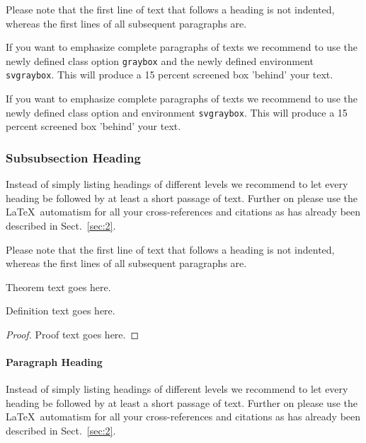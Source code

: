 \documentclass[graybox]{svmult}
\begin{document}
Please note that the first line of text that follows a heading is not indented, whereas the first lines of all subsequent paragraphs are.

\begin{svgraybox}
If you want to emphasize complete paragraphs of texts we recommend to use the newly defined class option \verb|graybox| and the newly defined environment \verb|svgraybox|. This will produce a 15 percent screened box 'behind' your text.

If you want to emphasize complete paragraphs of texts we recommend to use the newly defined class option and environment \verb|svgraybox|. This will produce a 15 percent screened box 'behind' your text.
\end{svgraybox}


\subsubsection{Subsubsection Heading}
Instead of simply listing headings of different levels we recommend to let every heading be followed by at least a short passage of text.  Further on please use the \LaTeX\ automatism for all your cross-references and citations as has already been described in Sect.~\ref{sec:2}.

Please note that the first line of text that follows a heading is not indented, whereas the first lines of all subsequent paragraphs are.

\begin{theorem}
Theorem text goes here.
\end{theorem}
%
%
\begin{definition}
Definition text goes here.
\end{definition}

\begin{proof}
Proof text goes here.
\end{proof}

\paragraph{Paragraph Heading} %
Instead of simply listing headings of different levels we recommend to let every heading be followed by at least a short passage of text.  Further on please use the \LaTeX\ automatism for all your cross-references and citations as has already been described in Sect.~\ref{sec:2}.
\end{document}

